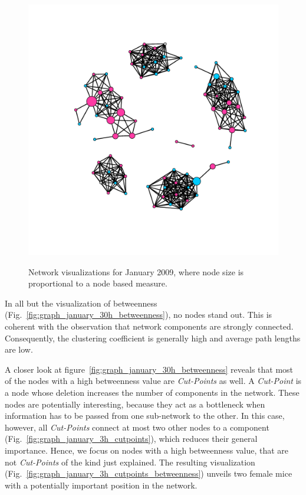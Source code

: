 \begin{figure}[htpb]
{					\label{fig:graph_january_30h_betweenness}
					\includegraphics[width=.45\textwidth]{assets/pdf/graph_january_30h_betweenness.pdf}
				} 		 				
		
	\caption[Network visualizations where node size is proportional to node based measures]{Network visualizations for January 2009, where node size is proportional to a node based measure.}
	\label{fig:graph_january_30h_node_based_measures} 
	 
\end{figure}

In all but the visualization of betweenness (Fig.~\ref{fig:graph_january_30h_betweenness}), no nodes stand out. This is coherent with the observation that network components are strongly connected. Consequently, the clustering coefficient is generally high and average path lengths are low.  


A closer look at figure~\ref{fig:graph_january_30h_betweenness} reveals that most of the nodes with a high betweenness value are \textit{Cut-Points} as well. A \textit{Cut-Point} is a node whose deletion increases the number of components in the network\citep{pajek:03}. These nodes are potentially interesting, because they act as a bottleneck when information has to be passed from one sub-network to the other. In this case, however, all \textit{Cut-Points} connect at most two other nodes to a component (Fig.~\ref{fig:graph_january_3h_cutpoints}), which reduces their general importance. Hence, we focus on nodes with a high betweenness value, that are not \textit{Cut-Points} of the kind just explained. The resulting visualization (Fig.~\ref{fig:graph_january_3h_cutpoints_betweenness}) unveils two female mice with a potentially important position in the network. 

